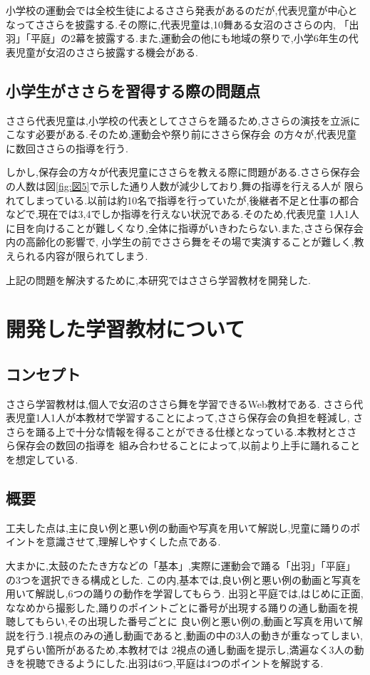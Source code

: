 \documentclass[12pt]{ltjsarticle}
\begin{document}
小学校の運動会では全校生徒によるささら発表があるのだが,代表児童が中心となってささらを披露する.その際に,代表児童は,10舞ある女沼のささらの内,
「出羽」「平庭」の2幕を披露する.また,運動会の他にも地域の祭りで,小学6年生の代表児童が女沼のささら披露する機会がある.



\subsection{小学生がささらを習得する際の問題点}
ささら代表児童は,小学校の代表としてささらを踊るため,ささらの演技を立派にこなす必要がある.そのため,運動会や祭り前にささら保存会
の方々が,代表児童に数回ささらの指導を行う.

しかし,保存会の方々が代表児童にささらを教える際に問題がある.ささら保存会の人数は図\ref{fig:図5}で示した通り人数が減少しており,舞の指導を行える人が
限られてしまっている.以前は約10名で指導を行っていたが,後継者不足と仕事の都合などで,現在では3,4でしか指導を行えない状況である.そのため,代表児童
1人1人に目を向けることが難しくなり,全体に指導がいきわたらない.また,ささら保存会内の高齢化の影響で,
小学生の前でささら舞をその場で実演することが難しく,教えられる内容が限られてしまう.

上記の問題を解決するために,本研究ではささら学習教材を開発した.
\newpage
\section{開発した学習教材について}
\subsection{コンセプト}
ささら学習教材は,個人で女沼のささら舞を学習できるWeb教材である.
ささら代表児童1人1人が本教材で学習することによって,ささら保存会の負担を軽減し,
ささらを踊る上で十分な情報を得ることができる仕様となっている.本教材とささら保存会の数回の指導を
組み合わせることによって,以前より上手に踊れることを想定している.

\subsection{概要}
工夫した点は,主に良い例と悪い例の動画や写真を用いて解説し,児童に踊りのポイントを意識させて,理解しやすくした点である.

大まかに,太鼓のたたき方などの「基本」,実際に運動会で踊る「出羽」「平庭」の3つを選択できる構成とした.
この内,基本では,良い例と悪い例の動画と写真を用いて解説し,6つの踊りの動作を学習してもらう.
出羽と平庭では,はじめに正面,ななめから撮影した,踊りのポイントごとに番号が出現する踊りの通し動画を視聴してもらい,その出現した番号ごとに
良い例と悪い例の,動画と写真を用いて解説を行う.1視点のみの通し動画であると,動画の中の3人の動きが重なってしまい,見ずらい箇所があるため,本教材では
2視点の通し動画を提示し,満遍なく3人の動きを視聴できるようにした.出羽は6つ,平庭は4つのポイントを解説する.
\end{document}
